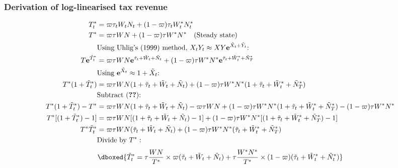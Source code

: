 \subsubsection{Derivation of log-linearised tax revenue}
\begin{align*}
    T^*_t &= \varpi\tau_t W_t N_t + (1-\varpi)\tau_t W^*_t N^*_t \\
    T^* &= \varpi\tau W N + (1-\varpi)\tau W^* N^* \quad \text{(Steady state)}\\
    &\text{Using Uhlig's (1999) method, $X_tY_t \approx XY\mathbf{e}^{\tilde{X}_t + \tilde{Y}_t}$: }\nonumber\\
    T\mathbf{e}^{\tilde{T}^*_t} &= \varpi \tau W N \mathbf{e}^{\tilde{\tau}_t+\tilde{W}_t+\tilde{N}_t} + (1-\varpi) \tau W^* N^* \mathbf{e}^{\tilde{\tau}_t+\tilde{W}^*_t+\tilde{N}^*_T} \\
    &\text{Using $\mathbf{e}^{\tilde{X}_t} \approx 1 + {\tilde{X}_t}$: }\nonumber\\
    T^* (1 + {\tilde{T}^*_t}) &= \varpi \tau W N (1 + {\tilde{\tau}_t+\tilde{W}_t+\tilde{N}_t}) + (1-\varpi) \tau W^* N^* (1 + {\tilde{\tau}_t+\tilde{W}^*_t+\tilde{N}^*_T}) \\
    &\text{Subtract (\textbf{??}): } \nonumber\\
    T^* (1 + {\tilde{T}^*_t}) - T^* &= \varpi \tau W N (1 + {\tilde{\tau}_t+\tilde{W}_t+\tilde{N}_t}) - \varpi\tau W N + (1-\varpi) \tau W^* N^* (1 + {\tilde{\tau}_t+\tilde{W}^*_t+\tilde{N}^*_T}) - (1-\varpi)\tau W^* N^* \\
    T^*[(1 + {\tilde{T}^*_t}) - 1] &= \varpi \tau W N [(1 + {\tilde{\tau}_t+\tilde{W}_t+\tilde{N}_t}) - 1] + (1-\varpi) \tau W^* N^* [(1 + {\tilde{\tau}_t+\tilde{W}^*_t+\tilde{N}^*_T}) - 1] \\
    T^*\tilde{T}^*_t &= \varpi \tau W N (\tilde{\tau}_t + \tilde{W}_t + \tilde{N}_t) + (1-\varpi) \tau W^* N^* (\tilde{\tau}_t+\tilde{W}^*_t+\tilde{N}^*_T) \\
    &\text{Divide by $T^*$}:\nonumber
\end{align*}
\begin{equation}
    \dboxed{\tilde{T}^*_t = \tau\frac{ W N}{T^*}\times \varpi (\tilde{\tau}_t + \tilde{W}_t + \tilde{N}_t) + \tau \frac{ W^* N^*}{T^*} \times (1-\varpi) (\tilde{\tau}_t+\tilde{W}^*_t+\tilde{N}^*_t)}
\end{equation}
\newpage